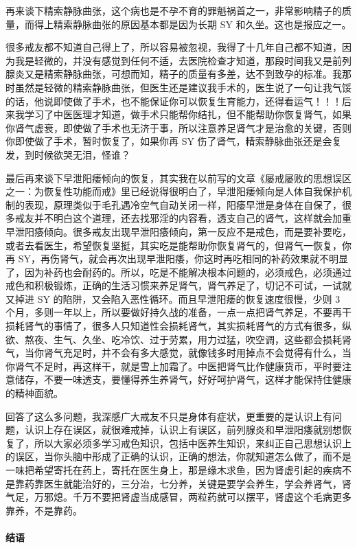 \documentclass{ctexart}
\begin{document}
再来谈下精索静脉曲张，这个病也是不孕不育的罪魁祸首之一，非常影响精子的质量，而得上精索静脉曲张的原因基本都是因为长期 SY 和久坐。这也是报应之一。

很多戒友都不知道自己得上了，所以容易被忽视，我得了十几年自己都不知道，因为我是轻微的，并没有感觉到任何不适，去医院检查才知道，那段时间我又是前列腺炎又是精索静脉曲张，可想而知，精子的质量有多差，达不到致孕的标准。我那时虽然是轻微的精索静脉曲张，但医生还是建议我手术的，医生说了一句让我气馁的话，他说即使做了手术，也不能保证你可以恢复生育能力，还得看运气！！！后来我学习了中医医理才知道，做手术只能帮你结扎，但不能帮助你恢复肾气，如果你肾气虚衰，即使做了手术也无济于事，所以注意养足肾气才是治愈的关键，否则你即使做了手术，暂时恢复了，如果你再 SY 伤了肾气，精索静脉曲张还是会复发，到时候欲哭无泪，怪谁？

最后再来谈下早泄阳痿倾向的恢复，其实我在以前写的文章《屡戒屡败的思想误区之一：为恢复性功能而戒》里已经说得很明白了，早泄阳痿倾向是人体自我保护机制的表现，原理类似于毛孔遇冷空气自动关闭一样，阳痿早泄是身体在自保了，很多戒友并不明白这个道理，还去找邪淫的内容看，透支自己的肾气，这样就会加重早泄阳痿倾向。很多戒友出现早泄阳痿倾向，第一反应不是戒色，而是要补要吃，或者去看医生，希望恢复坚挺，其实吃是能帮助你恢复肾气的，但肾气一恢复，你再 SY，再伤肾气，就会再次出现早泄阳痿，你这时再吃相同的补药效果就不明显了，因为补药也会耐药的。所以，吃是不能解决根本问题的，必须戒色，必须通过戒色和积极锻炼，正确的生活习惯来养足肾气，肾气养足了，切记不可试，一试就又掉进 SY 的陷阱，又会陷入恶性循环。而且早泄阳痿的恢复速度很慢，少则 3 个月，多则一年以上，所以要做好持久战的准备，一点一点把肾气养足，不要再干损耗肾气的事情了，很多人只知道性会损耗肾气，其实损耗肾气的方式有很多，纵欲、熬夜、生气、久坐、吃冷饮、过于劳累，用力过猛，吹空调，这些都会损耗肾气，当你肾气充足时，并不会有多大感觉，就像钱多时用掉点不会觉得有什么，当你肾气不足时，再这样干，就是雪上加霜了。中医把肾气比作健康货币，平时要注意储存，不要一味透支，要懂得养生养肾气，好好呵护肾气，这样才能保持住健康的精神面貌。

回答了这么多问题，我深感广大戒友不只是身体有症状，更重要的是认识上有问题，认识上存在误区，就很难戒掉，认识上有误区，前列腺炎和早泄阳痿就别想恢复了，所以大家必须多学习戒色知识，包括中医养生知识，来纠正自己思想认识上的误区，当你头脑中形成了正确的认识，正确的想法，你就知道怎么做了，而不是一味把希望寄托在药上，寄托在医生身上，那是缘木求鱼，因为肾虚引起的疾病不是靠药靠医生就能治好的，三分治，七分养，关键是要学会养生，学会养肾气，肾气足，万邪熄。千万不要把肾虚当成感冒，两粒药就可以摆平，肾虚这个毛病更多靠养，不是靠药。

\paragraph{结语}
\end{document}

